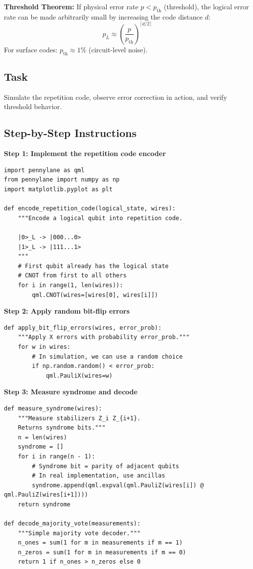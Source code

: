 \documentclass[11pt,a4paper]{article}
\begin{document}
\textbf{Threshold Theorem:} If physical error rate $p < p_{\text{th}}$ (threshold), the logical error rate can be made arbitrarily small by increasing the code distance $d$:
\[
p_L \approx \left(\frac{p}{p_{\text{th}}}\right)^{\lceil d/2 \rceil}
\]
For surface codes: $p_{\text{th}} \approx 1\%$ (circuit-level noise).

\subsection*{Task}
Simulate the repetition code, observe error correction in action, and verify threshold behavior.

\subsection*{Step-by-Step Instructions}

\textbf{Step 1: Implement the repetition code encoder}
\begin{lstlisting}
import pennylane as qml
from pennylane import numpy as np
import matplotlib.pyplot as plt

def encode_repetition_code(logical_state, wires):
    """Encode a logical qubit into repetition code.
    
    |0>_L -> |000...0>
    |1>_L -> |111...1>
    """
    # First qubit already has the logical state
    # CNOT from first to all others
    for i in range(1, len(wires)):
        qml.CNOT(wires=[wires[0], wires[i]])
\end{lstlisting}

\textbf{Step 2: Apply random bit-flip errors}
\begin{lstlisting}
def apply_bit_flip_errors(wires, error_prob):
    """Apply X errors with probability error_prob."""
    for w in wires:
        # In simulation, we can use a random choice
        if np.random.random() < error_prob:
            qml.PauliX(wires=w)
\end{lstlisting}

\textbf{Step 3: Measure syndrome and decode}
\begin{lstlisting}
def measure_syndrome(wires):
    """Measure stabilizers Z_i Z_{i+1}.
    Returns syndrome bits."""
    n = len(wires)
    syndrome = []
    for i in range(n - 1):
        # Syndrome bit = parity of adjacent qubits
        # In real implementation, use ancillas
        syndrome.append(qml.expval(qml.PauliZ(wires[i]) @ qml.PauliZ(wires[i+1])))
    return syndrome

def decode_majority_vote(measurements):
    """Simple majority vote decoder."""
    n_ones = sum(1 for m in measurements if m == 1)
    n_zeros = sum(1 for m in measurements if m == 0)
    return 1 if n_ones > n_zeros else 0
\end{lstlisting}
\end{document}
